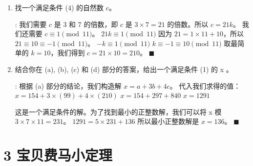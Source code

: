 \documentclass[11pt]{article}
\newenvironment{qparts}{\begin{enumerate}[{(}a{)}]}{\end{enumerate}}
\def\endproofmark{$\blacksquare$}
\newenvironment{proof}{\par\noindent{\bf 解答}:}{\endproofmark\smallskip}
\begin{document}
\begin{qparts}
\item 找一个满足条件 (4) 的自然数 c。
\begin{proof}
我们需要 $c$ 是 3 和 7 的倍数，即 $c$ 是 $3 \times 7 = 21$ 的倍数。所以 $c = 21k$。
我们还需要 $c \equiv 1 \pmod{11}$。
$21k \equiv 1 \pmod{11}$
因为 $21 = 1 \times 11 + 10$，所以 $21 \equiv 10 \equiv -1 \pmod{11}$。
$-k \equiv 1 \pmod{11}$
$k \equiv -1 \equiv 10 \pmod{11}$
取最简单的 $k=10$，我们得到 $c = 21 \times 10 = 210$。
\end{proof}

\item 结合你在 (a), (b), (c) 和 (d) 部分的答案，给出一个满足条件 (1) 的 x 。
\begin{proof}
根据 (a) 部分的结论，我们构造解 $x = a + 3b + 4c$。
代入我们求得的值：
$x = 154 + 3 \times (99) + 4 \times (210)$
$x = 154 + 297 + 840$
$x = 1291$

这是一个满足条件的解。为了找到最小的正整数解，我们可以将 x 模 $3 \times 7 \times 11 = 231$。
$1291 = 5 \times 231 + 136$
所以最小正整数解是 $x=136$。
\end{proof}
\end{qparts}

\newpage

\section*{3 宝贝费马小定理}
\end{document}
